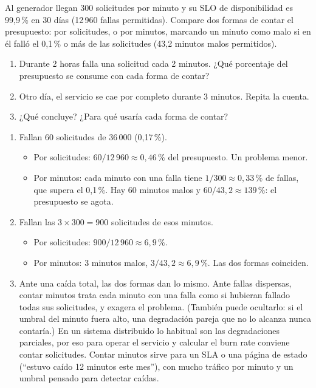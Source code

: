 \documentclass[variant=guia,cover=institutional,mode=screen]{ua-engineering-v6-article}
\begin{document}
\begin{uaexercise}
Al generador llegan 300 solicitudes por minuto y su SLO de disponibilidad es 99,9\,\% en 30 días (12\,960 fallas permitidas). Compare dos formas de contar el presupuesto: por solicitudes, o por minutos, marcando un minuto como malo si en él falló el 0,1\,\% o más de las solicitudes (43,2 minutos malos permitidos).
\begin{enumerate}
\item Durante 2 horas falla una solicitud cada 2 minutos. ¿Qué porcentaje del presupuesto se consume con cada forma de contar?
\item Otro día, el servicio se cae por completo durante 3 minutos. Repita la cuenta.
\item ¿Qué concluye? ¿Para qué usaría cada forma de contar?
\end{enumerate}
\end{uaexercise}
\begin{uaanswer}
\begin{enumerate}
\item Fallan 60 solicitudes de 36\,000 (0,17\,\%).
\begin{itemize}
\item Por solicitudes: $60 / 12\,960 \approx 0{,}46\,\%$ del presupuesto. Un problema menor.
\item Por minutos: cada minuto con una falla tiene $1/300 \approx 0{,}33\,\%$ de fallas, que supera el 0,1\,\%. Hay 60 minutos malos y $60 / 43{,}2 \approx 139\,\%$: el presupuesto se agota.
\end{itemize}
\item Fallan las $3 \times 300 = 900$ solicitudes de esos minutos.
\begin{itemize}
\item Por solicitudes: $900 / 12\,960 \approx 6{,}9\,\%$.
\item Por minutos: 3 minutos malos, $3 / 43{,}2 \approx 6{,}9\,\%$. Las dos formas coinciden.
\end{itemize}
\item Ante una caída total, las dos formas dan lo mismo. Ante fallas dispersas, contar minutos trata cada minuto con una falla como si hubieran fallado todas sus solicitudes, y exagera el problema. (También puede ocultarlo: si el umbral del minuto fuera alto, una degradación pareja que no lo alcanza nunca contaría.) En un sistema distribuido lo habitual son las degradaciones parciales, por eso para operar el servicio y calcular el burn rate conviene contar solicitudes. Contar minutos sirve para un SLA o una página de estado (``estuvo caído 12 minutos este mes''), con mucho tráfico por minuto y un umbral pensado para detectar caídas.
\end{enumerate}
\end{uaanswer}
\end{document}
